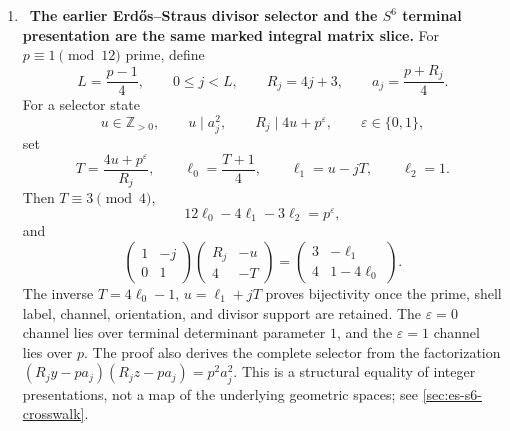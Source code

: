\begin{enumerate}[leftmargin=1.8em,itemsep=.65em]
There is also an exact hyperbolic bridge.  For
\[
 B=(18,-6)_{\mathbb Q},\qquad
 \mathcal O=\mathbb Z1\oplus
 \mathbb Z\frac{I+J}{2}\oplus
 \mathbb Z\frac{I-J}{2}\oplus
 \mathbb Z\frac{IJ}{2},
\]
the map
\[
 (a,q,n)\longmapsto2+\frac{qI+aJ+nIJ}{2}
\]
is a bijection from the parity-restricted ternary shell to the
reduced-trace-\(4\), reduced-norm-\(1\) locus.  The order has reduced
discriminant \(108\), index \(18\) in a maximal overorder, and is not an
Eichler order; \(B\) is ramified exactly at \(2,3\).  Each image is primitive
hyperbolic with centralizer
\(\{\pm\gamma^k:k\in\mathbb Z\}\), eigenvalues \(2\pm\sqrt3\), and length
\(2\log(2+\sqrt3)\).  The shell is a finite union of conjugacy classes, but
its canonical height \(4a+17n\) differs from the exact radial Huber height
\(7a+15\sqrt2\,n\), since
\[
 X_i(\gamma)^2=1+\frac{(7a+15\sqrt2\,n)^2}{48}.
\]
This theorem is independent of the existence of the proposed complex
structure on \(S^6\).  The stronger square-root discrepancy
\(R_{\mathrm K}(Y)-C_0Y=O_\varepsilon(Y^{1/2+\varepsilon})\) is an explicitly \Open
problem, not a hypothesis used in the asymptotic; see
\cref{koide-count-thm-coordinate-bijection,koide-count-thm-local-densities,%
koide-count-thm-archimedean-factor,koide-count-thm-linear-asymptotic,%
koide-param-thm:integral-parametrization,koide-param-thm:power-saving,%
koide-count-sec-census-1e8,%
koide-quat-exact-reformulation-of-the-koide-chamber-count,%
koide-lit-determination,%
koide-count-open-square-root-discrepancy}.

\item \Verified\ \textbf{The earlier Erd\H{o}s--Straus divisor selector and
the \(S^6\) terminal presentation are the same marked integral matrix slice.}
For \(p\equiv1\pmod{12}\) prime, define
\[
 L=\frac{p-1}{4},\qquad 0\le j<L,\qquad
 R_j=4j+3,\qquad a_j=\frac{p+R_j}{4}.
\]
For a selector state
\[
 u\in\mathbb Z_{>0},\qquad
 u\mid a_j^2,\qquad R_j\mid4u+p^\varepsilon,\qquad
 \varepsilon\in\{0,1\},
\]
set
\[
 T=\frac{4u+p^\varepsilon}{R_j},\qquad
 \ell_0=\frac{T+1}{4},\qquad
 \ell_1=u-jT,\qquad \ell_2=1.
\]
Then \(T\equiv3\pmod4\),
\[
 12\ell_0-4\ell_1-3\ell_2=p^\varepsilon,
\]
and
\[
 \boxed{
 \begin{pmatrix}1&-j\\0&1\end{pmatrix}
 \begin{pmatrix}R_j&-u\\4&-T\end{pmatrix}
 =\begin{pmatrix}3&-\ell_1\\4&1-4\ell_0\end{pmatrix}.}
\]
The inverse \(T=4\ell_0-1\), \(u=\ell_1+jT\) proves bijectivity once the
prime, shell label, channel, orientation, and divisor support are retained.
The \(\varepsilon=0\) channel lies over terminal determinant parameter \(1\),
and the \(\varepsilon=1\) channel lies over \(p\).  The proof also derives the
complete selector from the factorization
\((R_jy-pa_j)(R_jz-pa_j)=p^2a_j^2\).  This is a structural equality of
integer presentations, not a map of the underlying geometric spaces; see
\cref{sec:es-s6-crosswalk}.


\end{enumerate}
